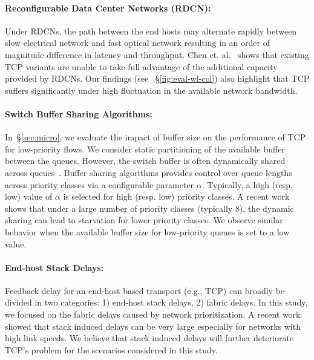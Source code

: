 
\paragraph{\textbf{Reconfigurable Data Center Networks (RDCN)}:} 
Under RDCNs, the path between the end hosts may alternate rapidly between slow electrical network and fast optical network resulting in an order of magnitude difference in latency and throughput. Chen et. al.~\cite{rdcn-tdtcp} shows that existing TCP variants are unable to take full advantage of the additional capacity provided by RDCNs. Our findings (see 
~\S\ref{fig:eval-wl-col}) also highlight that TCP suffers significantly under high fluctuation in the available network bandwidth.

\paragraph{\textbf{Switch Buffer Sharing Algorithms:}}
In~\S\ref{sec:micro}, we evaluate the impact of buffer size on the performance of TCP for low-priority flows. We consider static partitioning of the available buffer between the queues. However, the switch buffer is often dynamically shared across queues~\cite{dt,abm}. Buffer sharing algorithms provides control over queue lengths across priority classes via a configurable parameter $\alpha$. Typically, a high (resp.  low) value of $\alpha$ is selected for high (resp. low) priority classes. A recent work~\cite{abm} shows that under a large number of priority classes (typically 8), the dynamic sharing can lead to starvation for lower priority classes. We observe similar behavior when the available buffer size for low-priority queues is set to a low value.

\paragraph{\textbf{End-host Stack Delays:}}
Feedback delay for an end-host based transport (e.g., TCP) can broadly be divided in two categories: 1) end-host stack delays, 2) fabric delays.
In this study, we focused on the fabric delays caused by network prioritization. A recent work~\cite{stack-delays} showed that stack induced delays can be very large especially for networks with high link speeds. We believe that stack induced delays will further deteriorate TCP's problem for the scenarios considered in this study. 